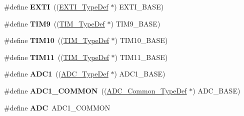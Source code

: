 \begin{DoxyCompactItemize}
\item 
\hypertarget{group___peripheral__declaration_ga9189e770cd9b63dadd36683eb9843cac}{\#define {\bfseries E\-X\-T\-I}~((\hyperlink{struct_e_x_t_i___type_def}{E\-X\-T\-I\-\_\-\-Type\-Def} $\ast$) E\-X\-T\-I\-\_\-\-B\-A\-S\-E)}\label{group___peripheral__declaration_ga9189e770cd9b63dadd36683eb9843cac}

\item 
\hypertarget{group___peripheral__declaration_gaf52b4b4c36110a0addfa98059f54a50e}{\#define {\bfseries T\-I\-M9}~((\hyperlink{struct_t_i_m___type_def}{T\-I\-M\-\_\-\-Type\-Def} $\ast$) T\-I\-M9\-\_\-\-B\-A\-S\-E)}\label{group___peripheral__declaration_gaf52b4b4c36110a0addfa98059f54a50e}

\item 
\hypertarget{group___peripheral__declaration_ga46b2ad3f5f506f0f8df0d2ec3e767267}{\#define {\bfseries T\-I\-M10}~((\hyperlink{struct_t_i_m___type_def}{T\-I\-M\-\_\-\-Type\-Def} $\ast$) T\-I\-M10\-\_\-\-B\-A\-S\-E)}\label{group___peripheral__declaration_ga46b2ad3f5f506f0f8df0d2ec3e767267}

\item 
\hypertarget{group___peripheral__declaration_gacfd11ef966c7165f57e2cebe0abc71ad}{\#define {\bfseries T\-I\-M11}~((\hyperlink{struct_t_i_m___type_def}{T\-I\-M\-\_\-\-Type\-Def} $\ast$) T\-I\-M11\-\_\-\-B\-A\-S\-E)}\label{group___peripheral__declaration_gacfd11ef966c7165f57e2cebe0abc71ad}

\item 
\hypertarget{group___peripheral__declaration_ga90d2d5c526ce5c0a551f533eccbee71a}{\#define {\bfseries A\-D\-C1}~((\hyperlink{struct_a_d_c___type_def}{A\-D\-C\-\_\-\-Type\-Def} $\ast$) A\-D\-C1\-\_\-\-B\-A\-S\-E)}\label{group___peripheral__declaration_ga90d2d5c526ce5c0a551f533eccbee71a}

\item 
\hypertarget{group___peripheral__declaration_gaf1919c64fc774aab31190346fd5457e2}{\#define {\bfseries A\-D\-C1\-\_\-\-C\-O\-M\-M\-O\-N}~((\hyperlink{struct_a_d_c___common___type_def}{A\-D\-C\-\_\-\-Common\-\_\-\-Type\-Def} $\ast$) A\-D\-C\-\_\-\-B\-A\-S\-E)}\label{group___peripheral__declaration_gaf1919c64fc774aab31190346fd5457e2}

\item 
\hypertarget{group___peripheral__declaration_ga54d148b91f3d356713f7e367a2243bea}{\#define {\bfseries A\-D\-C}~A\-D\-C1\-\_\-\-C\-O\-M\-M\-O\-N}\label{group___peripheral__declaration_ga54d148b91f3d356713f7e367a2243bea}


\end{DoxyCompactItemize}
